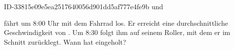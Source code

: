 \begin{exercise}
      {ID-33815e09e5ea2517640056d901dd5af777e4fe9b}
      {\xye{} und \xyf}
  \ifproblem\problem\par
    \xye{} fährt um 8:00 Uhr mit dem Fahrrad los. Er erreicht eine durchschnittliche
    Geschwindigkeit von . Um 8:30 folgt ihm \xyf{} auf seinem Roller, mit
    dem er  im Schnitt zurücklegt. Wann hat \xyf{} \xye{} eingeholt?
  \fi
\end{exercise}
